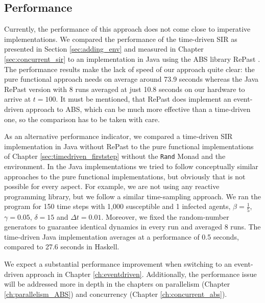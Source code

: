 \subsection{Performance}
\label{sub:timedriven_performance}
Currently, the performance of this approach does not come close to imperative implementations. We compared the performance of the time-driven SIR as presented in Section \ref{sec:adding_env} and measured in Chapter \ref{sec:concurrent_sir} to an implementation in Java using the ABS library RePast \cite{north_complex_2013}. The performance results make the lack of speed of our approach quite clear: the pure functional approach needs on average around 73.9 seconds whereas the Java RePast version with 8 runs averaged at just 10.8 seconds on our hardware to arrive at $t = 100$. It must be mentioned, that RePast does implement an event-driven approach to ABS, which can be much more effective \cite{meyer_event-driven_2014} than a time-driven one, so the comparison has to be taken with care.

As an alternative performance indicator, we compared a time-driven SIR implementation in Java without RePast to the pure functional implementations of Chapter \ref{sec:timedriven_firststep} without the \texttt{Rand} Monad and the environment. In the Java implementations we tried to follow conceptually similar approaches to the pure functional implementations, but obviously that is not possible for every aspect. For example, we are not using any reactive programming library, but we follow a similar time-sampling approach. We ran the program for 150 time steps with 1,000 susceptible and 1 infected agents, $\beta = \frac{1}{5}$, $\gamma = 0.05$, $\delta = 15$ and $\Delta t = 0.01$. Moreover, we fixed the random-number generators to guarantee identical dynamics in every run and averaged 8 runs. The time-driven Java implementation averages at a performance of 0.5 seconds, compared to 27.6 seconds in Haskell.

We expect a substantial performance improvement when switching to an event-driven approach \cite{meyer_event-driven_2014} in Chapter \ref{ch:eventdriven}. Additionally, the performance issue will be addressed more in depth in the chapters on parallelism (Chapter \ref{ch:parallelism_ABS}) and concurrency (Chapter \ref{ch:concurrent_abs}).